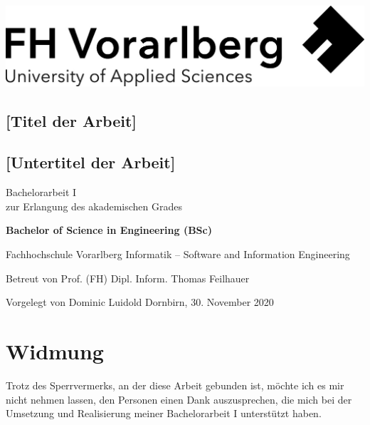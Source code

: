 \documentclass[a4paper,12pt,twoside]{scrreprt}
\begin{document}
\cleardoublepage %
\thispagestyle{empty}
\begin{titlepage}
    \begin{flushright}
    \includegraphics[width=0.4\linewidth]{images/Logo_FHV.jpg}
    \end{flushright}
    \begin{flushleft}
    \section*{[Titel der Arbeit]}
    \subsection*{[Untertitel der Arbeit]}
    \vspace{1cm}

    Bachelorarbeit I\\
    zur Erlangung des akademischen Grades
    \vspace{0.5cm}

    \textbf{Bachelor of Science in Engineering (BSc)}

    \vspace{1cm}
    Fachhochschule Vorarlberg\newline
    Informatik – Software and Information Engineering

    \vspace{0.5cm}

    Betreut von\newline
    Prof. (FH) Dipl. Inform. Thomas Feilhauer

    \vspace{0.5cm}

    Vorgelegt von\newline
    Dominic Luidold\newline
    Dornbirn, 30. November 2020
    \end{flushleft}
\end{titlepage}

\newpage
\section*{Widmung}
\label{sec:widmung}
Trotz des Sperrvermerks, an der diese Arbeit gebunden ist, möchte ich es mir nicht nehmen lassen, den Personen einen Dank auszusprechen, die mich bei der Umsetzung und Realisierung meiner Bachelorarbeit I unterstützt haben.
\end{document}
